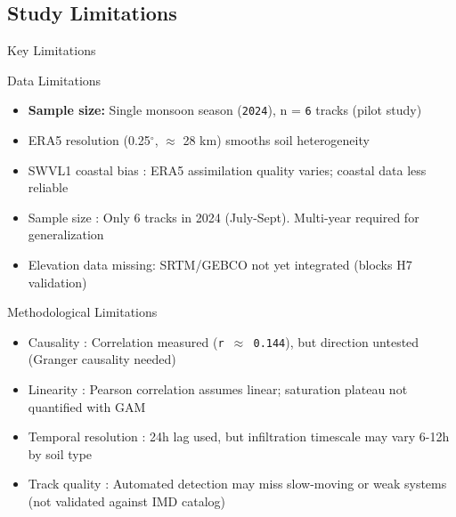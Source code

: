 \documentclass[8pt, aspectratio=169]{beamer}
\begin{document}
\subsection{Study Limitations}
\begin{frame}{Key Limitations}
    \vspace{-0.2cm}
    \begin{block}{\small Data Limitations}
        \footnotesize
        \begin{itemize}
            \item \textbf{Sample size:} Single monsoon season (\texttt{2024}), n = \texttt{6} tracks (pilot study)
            \item ERA5 resolution (0.25$^\circ$, $\approx$ 28 km) smooths soil heterogeneity
            \item SWVL1 coastal bias : ERA5 assimilation quality varies; coastal data less reliable
            \item Sample size : Only 6 tracks in 2024 (July-Sept). Multi-year required for generalization
            \item Elevation data missing: SRTM/GEBCO not yet integrated (blocks H7 validation)
        \end{itemize}
    \end{block}

    \vspace{-0.3cm}
    \begin{block}{\small Methodological Limitations}
        \footnotesize
        \begin{itemize}
           \item Causality : Correlation measured (\texttt{r $\approx$ 0.144}), but direction untested (Granger causality needed)
           \item Linearity : Pearson correlation assumes linear; saturation plateau not quantified with GAM
           \item Temporal resolution : 24h lag used, but infiltration timescale may vary 6-12h by soil type
           \item Track quality : Automated detection may miss slow-moving or weak systems (not validated against IMD catalog)
        \end{itemize}
    \end{block}


\end{frame}
\end{document}
